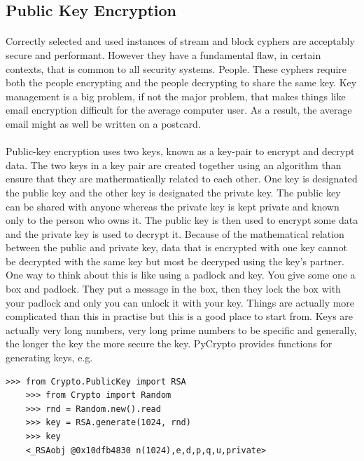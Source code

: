 \documentclass[12pt, a4paper, oneside]{book}
\begin{document}
\subsection{Public Key Encryption}
\paragraph{} Correctly selected and used instances of stream and block cyphers are acceptably secure and performant. However they have a fundamental flaw, in certain contexts, that is common to all security systems. People. These cyphers require both the people encrypting and the people decrypting to share the same key. Key management is a big problem, if not the major problem, that makes things like email encryption difficult for the average computer user. As a result, the average email might as well be written on a postcard.

\paragraph{} Public-key encryption uses two keys, known as a key-pair to encrypt and decrypt data. The two keys in a key pair are created together using an algorithm than ensure that they are mathermatically related to each other. One key is designated the public key and the other key is designated the private key. The public key can be shared with anyone whereas the private key is kept private and known only to the person who owns it. The public key is then used to encrypt some data and the private key is used to decrypt it. Because of the mathematical relation between the public and private key, data that is encrypted with one key cannot be decrypted with the same key but most be decryped using the key's partner. One way to think about this is like using a padlock and key. You give some one a box and padlock. They put a message in the box, then they lock the box with your padlock and only you can unlock it with your key. Things are actually more complicated than this in practise but this is a good place to start from. Keys are actually very long numbers, very long prime numbers to be specific and generally, the longer the key the more secure the key. PyCrypto provides functions for generating keys, e.g.

\begin{lstlisting}[style=DOS]
    >>> from Crypto.PublicKey import RSA
    >>> from Crypto import Random
    >>> rnd = Random.new().read
    >>> key = RSA.generate(1024, rnd)
    >>> key
    <_RSAobj @0x10dfb4830 n(1024),e,d,p,q,u,private>
\end{lstlisting}
\end{document}
